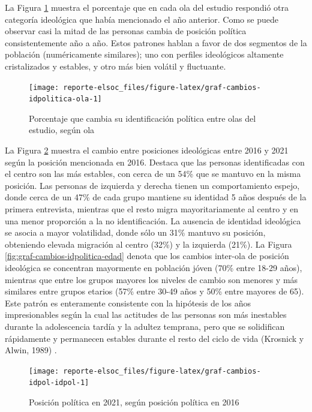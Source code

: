 \documentclass[
  12pt,
]{book}
\begin{document}
La Figura \ref{fig:graf-cambios-idpolitica-ola} muestra el porcentaje que en cada ola del estudio respondió otra categoría ideológica que había mencionado el año anterior. Como se puede observar casi la mitad de las personas cambia de posición política consistentemente año a año. Estos patrones hablan a favor de dos segmentos de la población (numéricamente similares); uno con perfiles ideológicos altamente cristalizados y estables, y otro más bien volátil y fluctuante.

\begin{figure}

{\centering \texttt{[image: reporte-elsoc\_files/figure-latex/graf-cambios-idpolitica-ola-1]} 

}

\caption{Porcentaje que cambia su identificación política entre olas del estudio, según ola}\label{fig:graf-cambios-idpolitica-ola}
\end{figure}

La Figura \ref{fig:graf-cambios-idpol-idpol} muestra el cambio entre posiciones ideológicas entre 2016 y 2021 según la posición mencionada en 2016. Destaca que las personas identificadas con el centro son las más estables, con cerca de un 54\% que se mantuvo en la misma posición. Las personas de izquierda y derecha tienen un comportamiento espejo, donde cerca de un 47\% de cada grupo mantiene su identidad 5 años después de la primera entrevista, mientras que el resto migra mayoritariamente al centro y en una menor proporción a la no identificación. La ausencia de identidad ideológica se asocia a mayor volatilidad, donde sólo un 31\% mantuvo su posición, obteniendo elevada migración al centro (32\%) y la izquierda (21\%). La Figura \ref{fig:graf-cambios-idpolitica-edad} denota que los cambios inter-ola de posición ideológica se concentran mayormente en población jóven (70\% entre 18-29 años), mientras que entre los grupos mayores los niveles de cambio son menores y más similares entre grupos etarios (57\% entre 30-49 años y 50\% entre mayores de 65). Este patrón es enteramente consistente con la hipótesis de los años impresionables según la cual las actitudes de las personas son más inestables durante la adolescencia tardía y la adultez temprana, pero que se solidifican rápidamente y permanecen estables durante el resto del ciclo de vida (Krosnick y Alwin, 1989) .

\begin{figure}

{\centering \texttt{[image: reporte-elsoc\_files/figure-latex/graf-cambios-idpol-idpol-1]} 

}

\caption{Posición política en 2021, según posición política en 2016}\label{fig:graf-cambios-idpol-idpol}
\end{figure}
\end{document}
